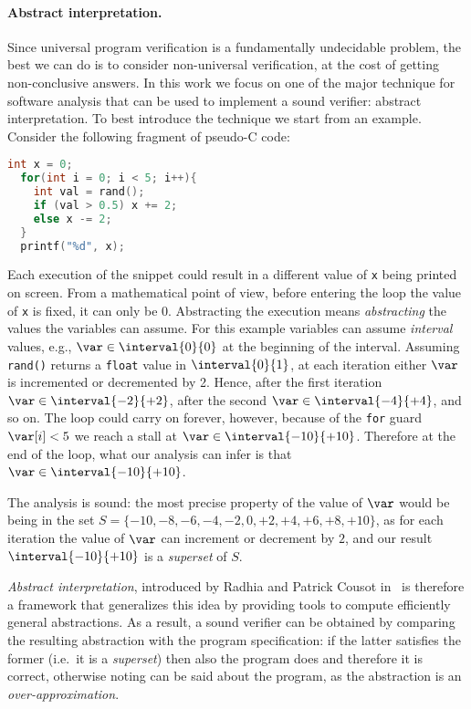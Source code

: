 \paragraph*{Abstract interpretation.} Since universal program
verification is a fundamentally undecidable problem, the best we can
do is to consider non-universal verification, at the cost of getting
non-conclusive answers. In this work we focus on one of the major
technique for software analysis that can be used to implement a sound
verifier: abstract interpretation. To best introduce the technique we
start from an example. Consider the following fragment of pseudo-C
code:

\begin{lstlisting}[language=C, label=codeexample, caption=Incrementing or decrementing randomly]
  int x = 0;
  for(int i = 0; i < 5; i++){
    int val = rand();
    if (val > 0.5) x += 2;
    else x -= 2;
  }
  printf("%d", x);
\end{lstlisting}

Each execution of the snippet could result in a different value of
\texttt{x} being printed on screen. From a mathematical point of view,
before entering the loop the value of \texttt{x} is fixed, it can only
be \(0\). Abstracting the execution means \emph{abstracting} the
values the variables can assume. For this example variables can assume
\emph{interval} values, e.g., \(\var \in \interval{0}{0}\) at the
beginning of the interval. Assuming \texttt{rand()} returns a
\texttt{float} value in \(\interval{0}{1}\), at each iteration either
\(\var\) is incremented or decremented by 2. Hence, after the first
iteration \(\var \in \interval{-2}{+2}\), after the second
\(\var \in \interval{-4}{+4}\), and so on. The loop could carry on
forever, however, because of the \texttt{for} guard \(\var[i] < 5\) we
reach a stall at \(\var \in \interval{-10}{+10}\). Therefore at the end
of the loop, what our analysis can infer is that
\(\var \in \interval{-10}{+10}\).

\medskip

\noindent
The analysis is sound: the most precise property of the value of
\(\var\) would be being in the set
\({S = \{-10, -8, -6, -4, -2, 0, +2, +4, +6, +8, +10\}}\), as for each
iteration the value of \(\var\) can increment or decrement by \(2\),
and our result \(\interval{-10}{+10}\) is a \emph{superset} of \(S\).

\medskip

\noindent
\emph{Abstract interpretation}, introduced by Radhia and Patrick
Cousot in~\cite{patrickradhia:one, patrickradhia:two} is therefore a
framework that generalizes this idea by providing tools to compute
efficiently general abstractions. As a result, a sound verifier can be
obtained by comparing the resulting abstraction with the program
specification: if the latter satisfies the former (i.e.\ it is a
\emph{superset}) then also the program does and therefore it is
correct, otherwise noting can be said about the program, as the
abstraction is an \emph{over-approximation}.

